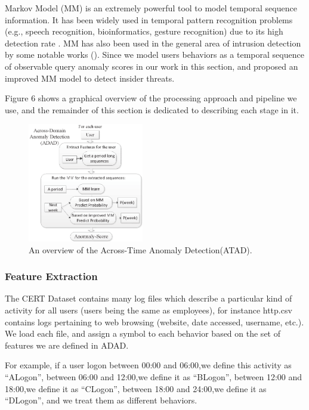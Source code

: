 \documentclass[conference]{IEEEtran}
\begin{document}
Markov Model (MM)\cite{b45} is an extremely powerful
tool to model temporal sequence information. It has been
widely used in temporal pattern recognition problems (e.g.,
speech recognition, bioinformatics, gesture recognition) due
to its high detection rate \cite{b55}. MM has also been used
in the general area of intrusion detection by some notable
works (\cite{b54}). Since we model users behaviors as a
temporal sequence of observable query anomaly scores in
our work in this section, and proposed an improved MM model to detect insider threats.

Figure 6 shows a graphical overview of the processing approach and pipeline we use, and the remainder of this section is dedicated to describing each stage in it.
\begin{figure}[htb]
\centerline{\includegraphics[width = 0.45\textwidth]{figure/figure6.eps}}
\caption{An overview of the Across-Time Anomaly Detection(ATAD).}
\label{fig}
\end{figure}
\subsubsection{Feature Extraction}
\iffalse
The CERT Dataset contains many log files which describe a particular kind of activity for all users (users being the same as employees), for instance http.csv contains logs pertaining to web browsing (website, date accessed, username, etc.). We load each file, and assign a symbol to each behavior based on the set of features we are defined in ADAD. 

For example, if a user logon between 00:00 and 06:00,we define this activity as “ALogon”, between 06:00 and 12:00,we define it as “BLogon”, between 12:00 and 18:00,we define it as “CLogon”, between 18:00 and 24:00,we define it as “DLogon”, and we treat them as different behaviors. 
\end{document}
